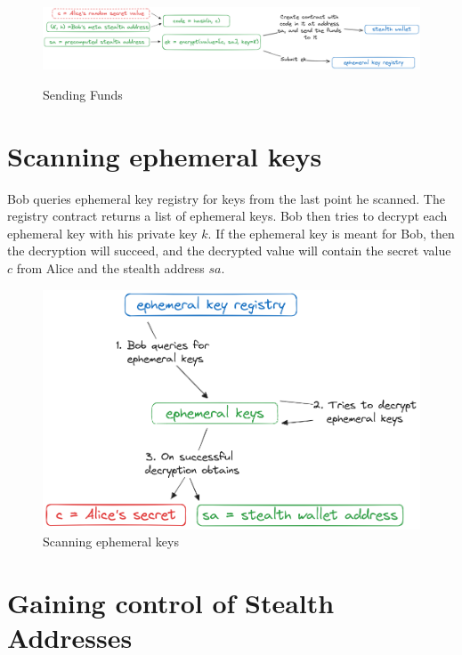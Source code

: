 \begin{figure}[h]
    \centering
    \includegraphics[scale=0.18]{assets/images/sending-funds.png}
    \caption{Sending Funds}
    \label{fig:sending-funds}
	\cite{ButerinIncompleteGuide}
    \vspace{0.5cm}
\end{figure}

\section{Scanning ephemeral keys}

Bob queries ephemeral key registry for keys from the last point he scanned.
The registry contract returns a list of ephemeral keys. Bob then tries to decrypt
each ephemeral key with his private key $k$. If the ephemeral key is meant for
Bob, then the decryption will succeed, and the decrypted value will contain
the secret value $c$ from Alice and the stealth address $sa$.

\begin{figure}[h]
    \centering
    \includegraphics[scale=0.3]{assets/images/ephemeral-keys.png}
    \caption{Scanning ephemeral keys}
    \label{fig:scanning-ephemeral-keys}
    \vspace{0.5cm}
\end{figure}

\section{Gaining control of Stealth Addresses}

